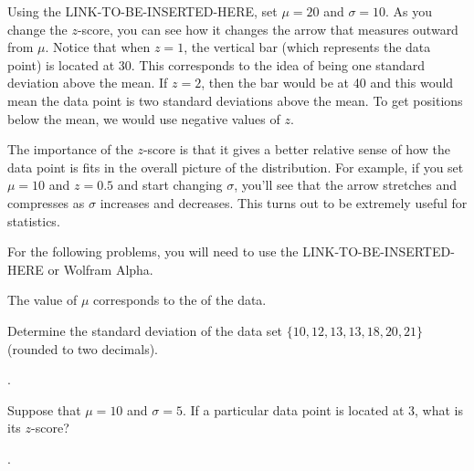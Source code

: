 \documentclass{ximera}
\begin{document}
Using the LINK-TO-BE-INSERTED-HERE, set $\mu = 20$ and $\sigma = 10$. As you change the $z$-score, you can see how it changes the arrow that measures outward from $\mu$. Notice that when $z = 1$, the vertical bar (which represents the data point) is located at 30. This corresponds to the idea of being one standard deviation above the mean. If $z = 2$, then the bar would be at 40 and this would mean the data point is two standard deviations above the mean. To get positions below the mean, we would use negative values of $z$.

The importance of the $z$-score is that it gives a better relative sense of how the data point is fits in the overall picture of the distribution. For example, if you set $\mu = 10$ and $z = 0.5$ and start changing $\sigma$, you'll see that the arrow stretches and compresses as $\sigma$ increases and decreases. This turns out to be extremely useful for statistics.

For the following problems, you will need to use the LINK-TO-BE-INSERTED-HERE or Wolfram Alpha.

\begin{question}
The value of $\mu$ corresponds to the \underline{\hspace{30pt}} of the data.
  \begin{solution}
    \begin{multiple-choice}
    \end{multiple-choice}
  \end{solution}
\end{question}

\begin{question}
Determine the standard deviation of the data set $\{ 10, 12, 13, 13, 18, 20, 21\}$ (rounded to two decimals).
  \begin{solution}
    .
  \end{solution}
\end{question}

\begin{question}
Suppose that $\mu = 10$ and $\sigma = 5$. If a particular data point is located at 3, what is its $z$-score?
  \begin{solution}
    .
  \end{solution}
\end{question}
\end{document}
